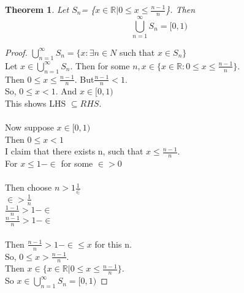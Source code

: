 \documentclass{article}
\newtheorem{theorem}{Theorem}
\begin{document}
\begin{theorem}
  Let $S_n$= \{$x \in \mathbb{R} | 0 \leq x \leq \frac{n-1}{n}$\}. Then
  \begin{displaymath}
    \bigcup_{n=1}^{\infty}{S_n} = [0,1)
  \end{displaymath}
\end{theorem}
\begin{proof}
  $\bigcup_{n=1}^{\infty}{S_n} = \{x: \exists n \in N$ such that $x \in S_{n}\}$ \\
  Let $x\in \bigcup_{n=1}^{\infty}{S_n}$. Then for some $n, x \in \{ x \in \mathbb{R}: 0 \leq x \leq \frac{n-1}{n}\}$.\\
  Then $0 \leq x \leq \frac{n-1}{n}$. But$\frac{n-1}{n} < 1 $. \\
  So, $0 \leq x < 1$. And $x \in [0,1)$\\
  This shows LHS $\subseteq RHS$.\\ \\
  Now suppose $x \in [ 0,1 )$\\
  Then $0 \leq x< 1$\\
  I claim that there exists n, such that $x \leq \frac{n-1}{n}$.\\
  For $x \leq 1 - \in$ for some $\in >0$\\ \\
  Then choose $n > 1 \frac{1}{\in}$\\
  $\in > \frac{1}{n}$\\
  $\frac{1-1}{n}>1-\in$\\
  $\frac{n-1}{n}> 1-\in$\\ \\
  Then $\frac{n-1}{n}>1-\in \leq x$ for this n.\\
  So, $0\leq x > \frac{n-1}{n}$.\\
  Then $x \in \{ x \in\mathbb{R} | 0 \leq x \leq \frac{n-1}{n}\}$.\\ 
  So $x\in \bigcup_{n=1}^{\infty}{S_n} = [0,1)$
\end{proof}




\newpage
\end{document}
